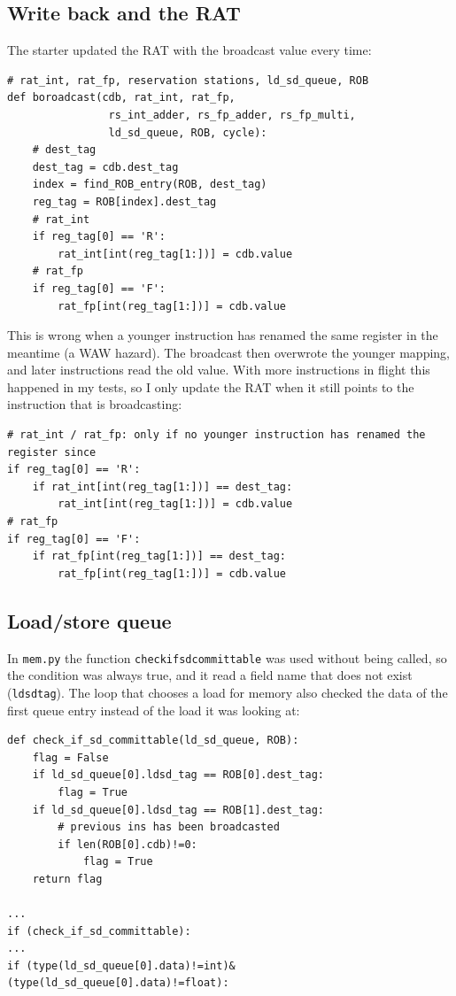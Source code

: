 \documentclass[11pt]{article}
\renewcommand{\_}{\origunderscore\allowbreak}
\begin{document}
\subsection{Write back and the RAT}

The starter updated the RAT with the broadcast value every time:

\begin{lstlisting}
# rat_int, rat_fp, reservation stations, ld_sd_queue, ROB
def boroadcast(cdb, rat_int, rat_fp, 
                rs_int_adder, rs_fp_adder, rs_fp_multi,
                ld_sd_queue, ROB, cycle):
    # dest_tag
    dest_tag = cdb.dest_tag
    index = find_ROB_entry(ROB, dest_tag)
    reg_tag = ROB[index].dest_tag
    # rat_int
    if reg_tag[0] == 'R':
        rat_int[int(reg_tag[1:])] = cdb.value
    # rat_fp
    if reg_tag[0] == 'F':
        rat_fp[int(reg_tag[1:])] = cdb.value 
\end{lstlisting}

This is wrong when a younger instruction has renamed the same register in the meantime (a WAW
hazard). The broadcast then overwrote the younger mapping, and later instructions read the old
value. With more instructions in flight this happened in my tests, so I only update the RAT when
it still points to the instruction that is broadcasting:

\begin{lstlisting}
# rat_int / rat_fp: only if no younger instruction has renamed the register since
if reg_tag[0] == 'R':
    if rat_int[int(reg_tag[1:])] == dest_tag:
        rat_int[int(reg_tag[1:])] = cdb.value
# rat_fp
if reg_tag[0] == 'F':
    if rat_fp[int(reg_tag[1:])] == dest_tag:
        rat_fp[int(reg_tag[1:])] = cdb.value 
\end{lstlisting}

\subsection{Load/store queue}

In \texttt{mem.py} the function \texttt{check\_if\_sd\_committable} was used without being
called, so the condition was always true, and it read a field name that does not exist
(\texttt{ldsd\_tag}). The loop that chooses a load for memory also checked the data of the first
queue entry instead of the load it was looking at:

\begin{lstlisting}
def check_if_sd_committable(ld_sd_queue, ROB):
    flag = False
    if ld_sd_queue[0].ldsd_tag == ROB[0].dest_tag:
        flag = True
    if ld_sd_queue[0].ldsd_tag == ROB[1].dest_tag:
        # previous ins has been broadcasted
        if len(ROB[0].cdb)!=0:
            flag = True
    return flag

...
if (check_if_sd_committable):
...
if (type(ld_sd_queue[0].data)!=int)&(type(ld_sd_queue[0].data)!=float):
\end{lstlisting}
\end{document}
